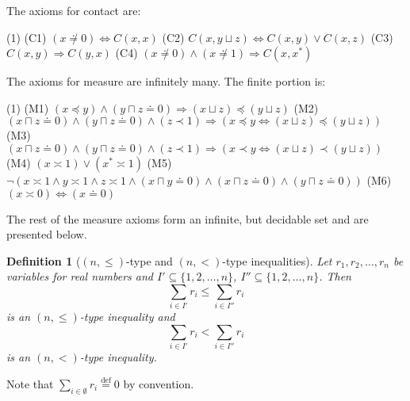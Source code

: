 \documentclass{article}
\newtheorem*{definition}{Definition}
\newcommand{\lcup}{\sqcup}
\newcommand{\lcap}{\sqcap}
\newcommand{\lstar}{^*}
\newcommand{\lparteq}{\doteq}
\newcommand{\lcont}{C}
\newcommand{\lmeasure}{\preceq}
\newcommand{\lmeasures}{\prec}
\newcommand{\lmeasureeq}{\asymp}
\newcommand{\eqdef}{\stackrel{\text{def}}{=}}
\begin{document}
The axioms for contact are:
\begin{tasks}(1)
  \task[] (C1) $(x \not \lparteq 0) \Leftrightarrow \lcont(x, x)$
  \task[] (C2) $\lcont(x, y \lcup z) \Leftrightarrow \lcont(x, y) \lor \lcont(x, z)$
  \task[] (C3) $\lcont(x, y) \Rightarrow \lcont(y, x)$
  \task[] (C4) $(x \not \lparteq 0) \land (x \not \lparteq 1) \Rightarrow \lcont(x, x\lstar)$
\end{tasks}

The axioms for measure are infinitely many. The finite portion is:
\begin{tasks}(1)
  \task[] (M1) $(x \lmeasure y) \land (y \lcap z \lparteq 0) \Rightarrow (x \lcup z) \lmeasure (y \lcup z)$
  \task[] (M2) $(x \lcap z \lparteq 0) \land (y \lcap z \lparteq 0) \land (z \lmeasures 1) \Rightarrow (x \lmeasure y \Leftrightarrow (x \lcup z) \lmeasure (y \lcup z))$
  \task[] (M3) $(x \lcap z \lparteq 0) \land (y \lcap z \lparteq 0) \land (z \lmeasures 1) \Rightarrow (x \lmeasures y \Leftrightarrow (x \lcup z) \lmeasures (y \lcup z))$
  \task[] (M4) $(x \lmeasureeq 1) \lor (x\lstar \lmeasureeq 1)$
  \task[] (M5) $\lnot(x \lmeasureeq 1 \land y \lmeasureeq 1 \land z \lmeasureeq 1 \land (x \lcap y \lparteq 0) \land (x \lcap z \lparteq 0) \land (y \lcap z \lparteq 0))$
  \task[] (M6) $(x \lmeasureeq 0) \Leftrightarrow (x \lparteq 0)$
\end{tasks}


The rest of the measure axioms form an infinite, but decidable set and are presented below.
\begin{definition}[$(n, \leq)$-type and $(n, <)$-type inequalities]
  Let $r_1, r_2, \dots, r_n$ be variables for real numbers and $I' \subseteq \{1, 2, \dots, n\}$, $I'' \subseteq \{1, 2, \dots, n\}$. Then
  \begin{equation*}
    \sum_{i \in I'}r_i \leq \sum_{i \in I''}r_i
  \end{equation*}
  is an \emph{$(n, \leq)$-type inequality} and
  \begin{equation*}
    \sum_{i \in I'}r_i < \sum_{i \in I''}r_i
  \end{equation*}
  is an \emph{$(n, <)$-type inequality}.
\end{definition}
Note that $\sum_{i \in \emptyset}r_i \eqdef 0$ by convention.
\end{document}
